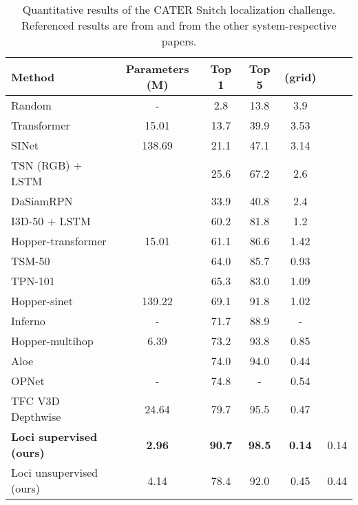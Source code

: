 \documentclass{article} \usepackage{iclr2023_conference_arxiv,times}
\begin{document}
\begin{table}[t]
    \caption{Quantitative results of the CATER Snitch localization challenge. Referenced results are from \cite{zhou2021hopper} and from the other system-respective papers.}
    \centering
    \footnotesize
    \begin{tabularx}{\linewidth}{ l c C C C C }
        \toprule
         Method & Parameters (M) & Top 1 & Top 5 &  (grid) &  \\
        \midrule
         Random& - & 2.8 & 13.8 & 3.9 & \\
         Transformer \citep{vaswani2017attention} & 15.01 & 13.7 & 39.9 & 3.53 & \\
         SINet \citep{ma2018attend} & 138.69 & 21.1 & 47.1 & 3.14 & \\
         TSN (RGB) + LSTM \citep{wang2016temporal} && 25.6 & 67.2 & 2.6 & \\
         DaSiamRPN \citep{zhu2018distractor} && 33.9 & 40.8 & 2.4 & \\
         I3D-50 + LSTM \citep{carreira2017quo} && 60.2 &81.8 & 1.2 & \\
         Hopper-transformer \citep{zhou2021hopper}  & 15.01 & 61.1 & 86.6 & 1.42 & \\
         TSM-50 \citep{lin2019tsm} && 64.0 &85.7 & 0.93 & \\
         TPN-101 \citep{yang2020temporal}&& 65.3 & 83.0 & 1.09 & \\
         Hopper-sinet \citep{zhou2021hopper}  & 139.22 & 69.1 & 91.8 & 1.02 & \\
         Inferno \citep{castrejon2021inferno} & -  & 71.7 & 88.9 & - & \\
         Hopper-multihop \citep{zhou2021hopper} &6.39 & 73.2 & 93.8 & 0.85 & \\
         Aloe \citep{ding2020object} & & 74.0 & 94.0 & 0.44 & \\
         OPNet \citep{shamsian2020learning} & -  & 74.8  & - & 0.54 & \\
         TFC V3D Depthwise \citep{zhang2022tfcnet} & 24.64  & 79.7 & 95.5 & 0.47 & \\
         \textbf{Loci supervised (ours) } & \textbf{2.96}  & \textbf{90.7} & \textbf{98.5}  & \textbf{0.14} & 0.14 \\
         \midrule
         Loci unsupervised (ours) & 4.14 &  78.4 & 92.0 & 0.45 & 0.44 \\
        \bottomrule
    \end{tabularx}
    \label{tab:CATERresults}
\end{table}
\end{document}
